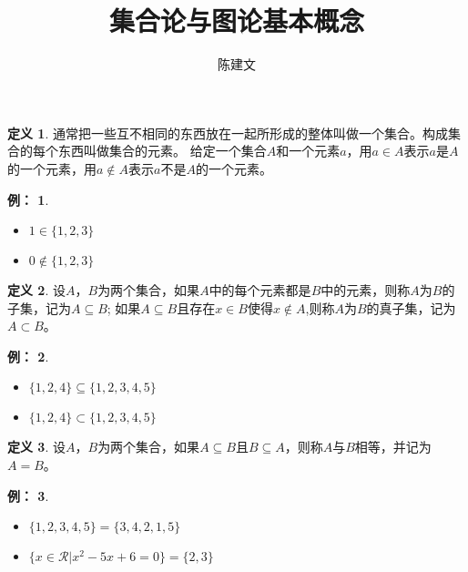 \documentclass{beamer}
\begin{document}
\begin{CJK*}{UTF8}{gbsn}


  
\theoremstyle{definition}
\newtheorem{Def}{定义}
\theoremstyle{example}
\newtheorem*{Ex}{例：}
\newtheorem*{Thm}{定理}
\newtheorem*{Exercise}{习题}

\date{}
\author{陈建文}
\title{集合论与图论基本概念}
\begin{frame}
  \titlepage
\end{frame}

\begin{frame}
  \begin{Def}
通常把一些互不相同的东西放在一起所形成的整体叫做一个集合。构成集合的每个东西叫做集合的元素。
给定一个集合$A$和一个元素$a$，用$a \in A$表示$a$是$A$的一个元素，用$a \notin A$表示$a$不是$A$的一个元素。
\end{Def}
\begin{Ex}
  \begin{itemize}
  \item $1\in \{1,2,3\}$
  \item $0\notin \{1,2,3\}$
  \end{itemize}
\end{Ex}
\end{frame}
\begin{frame}
\begin{Def}
设$A$，$B$为两个集合，如果$A$中的每个元素都是$B$中的元素，则称$A$为$B$的子集，记为$A \subseteq B$; 如果$A \subseteq B$且存在$x\in B$使得$x \notin A$,则称$A$为$B$的真子集，记为$A\subset B$。    
\end{Def}
\begin{Ex}
\begin{itemize}
  \item   $\{1,2,4\} \subseteq \{1,2,3,4,5\}$
\item $\{1,2,4\} \subset \{1,2,3,4,5\}$
\end{itemize}
\end{Ex}
\end{frame}

\begin{frame}
\begin{Def}
设$A$，$B$为两个集合，如果$A \subseteq B$且$B \subseteq A$，则称$A$与$B$相等，并记为$A=B$。
\end{Def}
\begin{Ex}
\begin{itemize}
\item   $\{1,2,3,4,5\} = \{3,4,2,1,5\}$
\item $\{x \in \mathcal{R} | x^2 -5x + 6 = 0\} = \{2,3\}$
\end{itemize}
\end{Ex}
\end{frame}





\end{CJK*}
\end{document}
